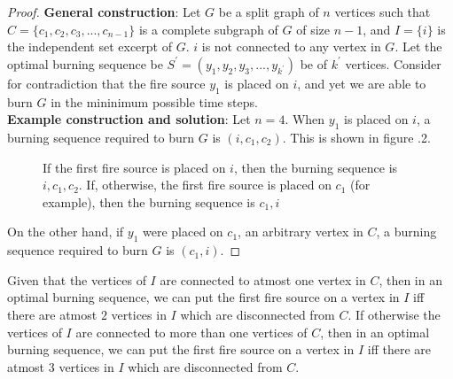 \begin{proof}
\noindent \textbf{General construction}: Let $G$ be a split graph of $n$ vertices such that $C = \{c_1, c_2, c_3, . . ., c_{n-1}\}$ is a complete subgraph of $G$ of size $n-1$, and $I = \{i\}$ is the independent set excerpt of $G$. $i$ is not connected to any vertex in $G$. Let the optimal burning sequence be $S^\prime = (y_1, y_2, y_3, . . ., y_{k^\prime})$ be of $k^\prime$ vertices. Consider for contradiction that the fire source $y_1$ is placed on $i$, and yet we are able to burn $G$ in the mininimum possible time steps.\\

\noindent \textbf{Example construction and solution}: Let $n=4$. When $y_1$ is placed on $i$, a burning sequence required to burn $G$ is $(i, c_1, c_2)$. This is shown in figure \thech.2.

\begin{figure}
    \centering
    \caption{If the first fire source is placed on $i$, then the burning sequence is $i,c_1,c_2$. If, otherwise, the first fire source is placed on $c_1$ (for example), then the burning sequence is $c_1,i$}
    \label{figure:burning-general-split-graphs}
\end{figure}

On the other hand, if $y_1$ were placed on $c_1$, an arbitrary vertex in $C$, a burning sequence required to burn $G$ is $(c_1, i)$.
\end{proof}

Given that the vertices of $I$ are connected to atmost one vertex in $C$, then in an optimal burning sequence, we can put the first fire source on a vertex in $I$ iff there are atmost $2$ vertices in $I$ which are disconnected from $C$. 
If otherwise the vertices of $I$ are connected to more than one vertices of $C$, then in an optimal burning sequence, we can put the first fire source on a vertex in $I$ iff there are atmost $3$ vertices in $I$ which are disconnected from $C$.

